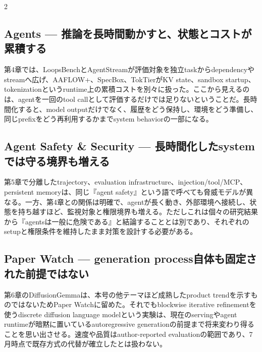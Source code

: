 \begin{multicols}{2}
\subsection{Agents — 推論を長時間動かすと、状態とコストが累積する}
第4章では、LoopsBenchとAgentStreamが評価対象を独立taskからdependencyやstreamへ広げ、AAFLOW+、SpecBox、TokTierがKV state、sandbox startup、tokenizationというruntime上の累積コストを別々に扱った。ここから見えるのは、agentを一回のtool callとして評価するだけでは足りないということだ。長時間化すると、model outputだけでなく、履歴をどう保持し、環境をどう準備し、同じprefixをどう再利用するかまでsystem behaviorの一部になる。 \cite{src-30d9d574d4a1,src-4141dfcd9b12,src-4051106eaef3,src-2266222d4bb7,src-6513817b493c}

\subsection{Agent Safety \& Security — 長時間化したsystemでは守る境界も増える}
第5章で分離したtrajectory、evaluation infrastructure、injection/tool/MCP、persistent memoryは、同じ『agent safety』という語で呼べても脅威モデルが異なる。一方、第4章との関係は明確で、agentが長く動き、外部環境へ接続し、状態を持ち越すほど、監視対象と権限境界も増える。ただしこれは個々の研究結果から『agentsは一般に危険である』と結論することとは別であり、それぞれのsetupと権限条件を維持したまま対策を設計する必要がある。 \cite{src-a5ab872c216c,src-d925d8c91f46,src-e08216aa168c,src-62c4ed3c6c14,src-0ebd2e2bdbb7,src-65271d0e1d0b,src-1eac9e55bab6,src-021c5e6be64a,src-732b15b19744}

\subsection{Paper Watch — generation process自体も固定された前提ではない}
第6章のDiffusionGemmaは、本号の他テーマほど成熟したproduct trendを示すものではないためPaper Watchに留めた。それでもblockwise iterative refinementを使うdiscrete diffusion language modelという実験は、現在のservingやagent runtimeが暗黙に置いているautoregressive generationの前提まで将来変わり得ることを思い出させる。速度や品質はauthor-reported evaluationの範囲であり、7月時点で既存方式の代替が確立したとは扱わない。 \cite{src-ab19992e4c80}

\end{multicols}
\Needspace{0.34\textheight}
